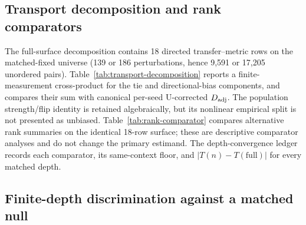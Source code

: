 \documentclass{article}
\begin{document}
\subsection{Transport decomposition and rank comparators}

The full-surface decomposition contains 18 directed transfer--metric rows on
the matched-fixed universe (139 or 186 perturbations, hence 9,591 or 17,205
unordered pairs). Table~\ref{tab:transport-decomposition} reports a
finite-measurement cross-product for the tie and directional-bias components,
and compares their sum with canonical per-seed U-corrected $D_{\rm adj}$.
The population strength/flip identity is retained algebraically, but its
nonlinear empirical split is not presented as unbiased. Table~\ref{tab:rank-comparator}
compares alternative rank summaries on the identical 18-row surface; these are
descriptive comparator analyses and do not change the primary estimand. The
depth-convergence ledger records each comparator, its same-context floor, and
$|T(n)-T(\mathrm{full})|$ for every matched depth.




\subsection{Finite-depth discrimination against a matched null}
\end{document}
